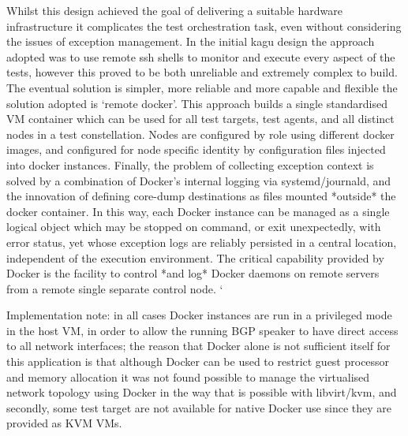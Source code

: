Whilst this design achieved the goal of delivering a suitable hardware infrastructure it complicates the test orchestration task, even without considering the issues of exception management.  In the initial kagu design the approach adopted was to use remote ssh shells to monitor and execute every aspect of the tests, however this proved to be both unreliable and extremely complex to build.  The eventual solution is simpler, more reliable and more capable and flexible \- the solution adopted is ‘remote docker’.  This approach builds a single standardised VM container which can be used for all test targets, test agents, and all distinct nodes in a test constellation. Nodes are configured by role using different docker images, and configured for node specific identity by configuration files injected into docker instances.  Finally, the problem of collecting exception context is solved by a combination of Docker’s  internal logging via systemd/journald, and the innovation of defining core-dump destinations as files mounted *outside* the docker container.  In this way, each Docker instance can be managed as a single logical object which may be stopped on command, or exit unexpectedly, with error status, yet whose exception logs are reliably persisted in a central location, independent of the execution environment.  The critical capability provided by Docker is the facility to control *and log* Docker daemons on remote servers from a remote single separate control node. `

Implementation note: in all cases Docker instances are run in a privileged mode in the host VM, in order to allow the running BGP speaker to have direct access to all network interfaces; the reason that Docker alone is not sufficient itself for this application is that although Docker can be used to restrict guest processor and memory allocation it was not found possible to manage the virtualised network topology using Docker in the way that is possible with libvirt/kvm, and secondly, some test target are not available for native Docker use since they are provided as KVM VMs.





